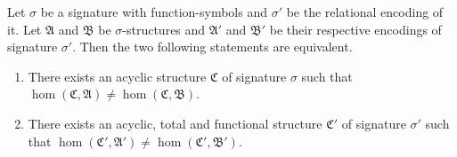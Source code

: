 \begin{lemma}
	Let $\sigma$ be a signature with function-symbols and $\sigma'$ be the relational encoding of it.
	Let $\mathfrak A$ and $\mathfrak B$ be $\sigma$-structures and $\mathfrak A'$ and $\mathfrak B'$ be their respective encodings of signature $\sigma'$.
	Then the two following statements are equivalent.
	\begin{enumerate}
		\item There exists an acyclic structure $\mathfrak C$ of signature $\sigma$ such that $\hom(\mathfrak C,\mathfrak A)\neq\hom(\mathfrak C,\mathfrak B)$.
		\item There exists an acyclic, total and functional structure $\mathfrak C'$ of signature $\sigma'$ such that $\hom(\mathfrak C',\mathfrak A')\neq \hom(\mathfrak C',\mathfrak B')$.
	\end{enumerate}
	\label{lem:acycTotalAndFunctionalEquivAcyc}
\end{lemma}
